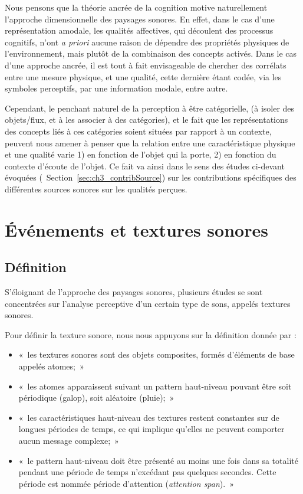 Nous pensons que la théorie ancrée de la cognition motive naturellement l'approche dimensionnelle des paysages sonores. En effet, dans le cas d'une représentation amodale, les qualités affectives, qui découlent des processus cognitifs, n'ont \emph{a priori} aucune raison de dépendre des propriétés physiques de l'environnement, mais plutôt de la combinaison des concepts activés. Dans le cas d'une approche ancrée, il est tout à fait envisageable de chercher des corrélats entre une mesure physique, et une qualité, cette dernière étant codée, via les symboles perceptifs, par une information modale, entre autre.

Cependant, le penchant naturel de la perception à être catégorielle, (à isoler des objets/flux, et à les associer à des catégories), et le fait que les représentations des concepts liés à ces catégories soient situées par rapport à un contexte, peuvent nous amener à penser que la relation entre une caractéristique physique et une qualité varie 1) en fonction de l'objet qui la porte, 2) en fonction du contexte d'écoute de l'objet. Ce fait va ainsi dans le sens des études ci-devant évoquées (\cf~Section~\ref{sec:ch3_contribSource}) sur les contributions spécifiques des différentes sources sonores sur les qualités perçues.


\section{Événements et textures sonores}
\label{sec:ch3_eventTexture}

\subsection{Définition}
\label{sec:ch3_textureDef}

S'éloignant de l'approche des paysages sonores, plusieurs études se sont concentrées sur l'analyse perceptive d'un certain type de sons, appelés textures sonores.

Pour définir la texture sonore, nous nous appuyons sur la définition donnée par \citep[p. 25]{saint1995classification}:  

\begin{itemize}
\item «~les textures sonores sont des objets composites, formés d'éléments de base appelés atomes;~»
\item «~les atomes apparaissent suivant un pattern haut-niveau pouvant être soit périodique (galop), soit aléatoire (pluie);~»
\item «~les caractéristiques haut-niveau des textures restent constantes sur de longues périodes de temps, ce qui implique qu'elles ne peuvent comporter aucun message complexe;~»
\item «~le pattern haut-niveau doit être présenté au moins une fois dans sa totalité pendant une période de temps n’excédant pas quelques secondes. Cette période est nommée période d'attention (\emph{attention span}).~»
\end{itemize}

